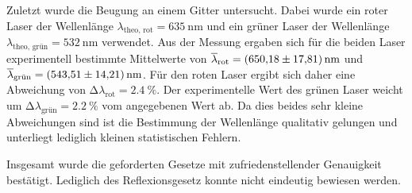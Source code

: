 Zuletzt wurde die Beugung an einem Gitter untersucht. Dabei wurde ein roter Laser der Wellenlänge $\lambda_{\text{theo, rot}} = \qty{635}{\nano\metre}$ und ein grüner Laser
der Wellenlänge $\lambda_{\text{theo, grün}} = \qty{532}{\nano\metre}$ verwendet. Aus der Messung ergaben sich für die beiden Laser experimentell bestimmte Mittelwerte von 
$\overline{\lambda}_{\text{rot}} = \qty{650.18 +- 17.81}{\nano\metre}$ und $\overline{\lambda}_{\text{grün}} = \qty{543.51 +- 14.21}{\nano\metre}$. Für den roten Laser ergibt 
sich daher eine Abweichung von $\mathrm{\Delta}\lambda_{\text{rot}} = \qty{2.4}{\percent}$. Der experimentelle Wert des grünen Laser weicht um 
$\mathrm{\Delta}\lambda_{\text{grün}} = \qty{2.2}{\percent}$ vom angegebenen Wert ab. Da dies beides sehr kleine Abweichungen sind ist die Bestimmung der Wellenlänge 
qualitativ gelungen und unterliegt lediglich kleinen statistischen Fehlern.

Insgesamt wurde die geforderten Gesetze mit zufriedenstellender Genauigkeit bestätigt. Lediglich des Reflexionsgesetz konnte nicht eindeutig bewiesen werden. 